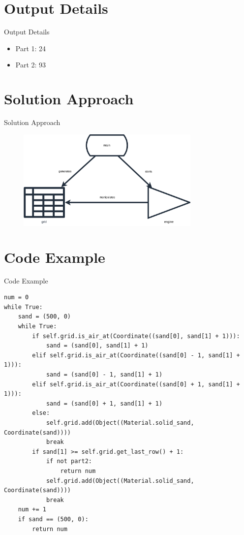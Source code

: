 \documentclass{beamer}
\begin{document}
\section{Output Details}

\begin{frame}{Output Details}
    \begin{itemize}
        \item Part 1: 24
        \item Part 2: 93
    \end{itemize}
\end{frame}
\section{Solution Approach}

\begin{frame}{Solution Approach}
    \begin{figure}[H]
        \centering
        \includegraphics[width=0.8\textwidth]{Images/AoC22_14_high_level.png}
    \end{figure}
\end{frame}

\section{Code Example}

\begin{frame}[fragile]{Code Example}
    \begin{verbatim}
num = 0
while True:
    sand = (500, 0)
    while True:
        if self.grid.is_air_at(Coordinate((sand[0], sand[1] + 1))):
            sand = (sand[0], sand[1] + 1)
        elif self.grid.is_air_at(Coordinate((sand[0] - 1, sand[1] + 1))):
            sand = (sand[0] - 1, sand[1] + 1)
        elif self.grid.is_air_at(Coordinate((sand[0] + 1, sand[1] + 1))):
            sand = (sand[0] + 1, sand[1] + 1)
        else:
            self.grid.add(Object((Material.solid_sand, Coordinate(sand))))
            break
        if sand[1] >= self.grid.get_last_row() + 1:
            if not part2:
                return num
            self.grid.add(Object((Material.solid_sand, Coordinate(sand))))
            break
    num += 1
    if sand == (500, 0):
        return num
    \end{verbatim}
\end{frame}
\end{document}
